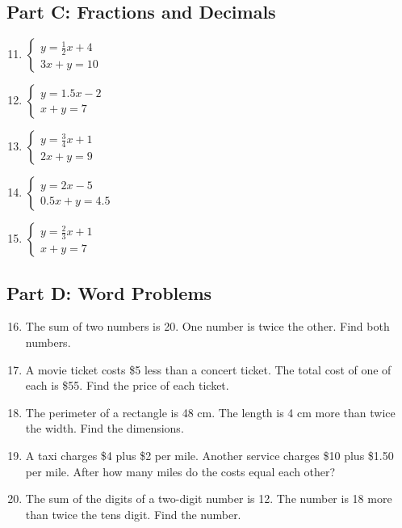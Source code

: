 \documentclass[12pt]{article}
\begin{document}
\subsection*{Part C: Fractions and Decimals}
\begin{enumerate}
    \setcounter{enumi}{10}
    \item \(\begin{cases} y = \tfrac{1}{2}x + 4 \\ 3x + y = 10 \end{cases}\)
    \item \(\begin{cases} y = 1.5x - 2 \\ x + y = 7 \end{cases}\)
    \item \(\begin{cases} y = \tfrac{3}{4}x + 1 \\ 2x + y = 9 \end{cases}\)
    \item \(\begin{cases} y = 2x - 5 \\ 0.5x + y = 4.5 \end{cases}\)
    \item \(\begin{cases} y = \tfrac{2}{3}x + 1 \\ x + y = 7 \end{cases}\)
\end{enumerate}

\subsection*{Part D: Word Problems}
\begin{enumerate}
    \setcounter{enumi}{15}
    \item The sum of two numbers is 20. One number is twice the other. Find both numbers.
    \item A movie ticket costs \$5 less than a concert ticket. The total cost of one of each is \$55. Find the price of each ticket.
    \item The perimeter of a rectangle is 48 cm. The length is 4 cm more than twice the width. Find the dimensions.
    \item A taxi charges \$4 plus \$2 per mile. Another service charges \$10 plus \$1.50 per mile. After how many miles do the costs equal each other?
    \item The sum of the digits of a two-digit number is 12. The number is 18 more than twice the tens digit. Find the number.
\end{enumerate}
\end{document}
